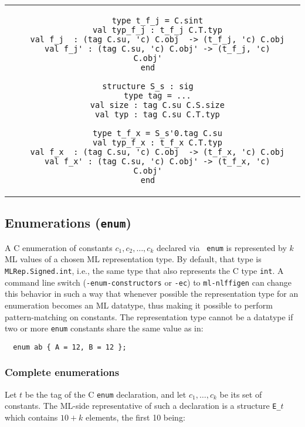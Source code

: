 \documentclass[titlepage,letterpaper]{article}
\newcommand{\gentool}{{\tt ml-nlffigen}}
\begin{document}
\begin{small}
\begin{center}
\begin{tabular}{c|c}
\begin{minipage}{4in}
\begin{verbatim}
    type t_f_j = C.sint
    val typ_f_j : t_f_j C.T.typ
    val f_j  : (tag C.su, 'c) C.obj  -> (t_f_j, 'c) C.obj
    val f_j' : (tag C.su, 'c) C.obj' -> (t_f_j, 'c) C.obj'
end

structure S_s : sig
    type tag = ...
    val size : tag C.su C.S.size
    val typ : tag C.su C.T.typ

    type t_f_x = S_s'0.tag C.su
    val typ_f_x : t_f_x C.T.typ
    val f_x  : (tag C.su, 'c) C.obj  -> (t_f_x, 'c) C.obj
    val f_x' : (tag C.su, 'c) C.obj' -> (t_f_x, 'c) C.obj'
end

\end{verbatim}
\end{minipage}  
\end{tabular}
\end{center}
\end{small}

\subsection{Enumerations ({\tt enum})}

A C enumeration of constants $c_1, c_2, \ldots, c_k$ declared via {\tt
  enum} is represented by $k$ ML values of a chosen ML representation
type.  By default, that type is {\tt MLRep.Signed.int}, i.e., the same
type that also represents the C type {\tt int}.  A command line switch
({\tt -enum-constructors} or {\tt -ec}) to {\gentool} can change this
behavior in such a way that whenever possible the representation type
for an enumeration becomes an ML datatype, thus making it possible to
perform pattern-matching on constants.  The representation type cannot be a
datatype if two or more {\tt enum} constants share the same value as in:

\begin{verbatim}
  enum ab { A = 12, B = 12 };
\end{verbatim}

\subsubsection*{Complete enumerations}

Let $t$ be the tag of the C {\tt enum} declaration, and let
$c_1,\ldots,c_k$ be its set of constants.  The ML-side representative
of such a declaration is a structure {\tt E\_$t$} which contains $10+k$
elements, the first 10 being:
\end{document}
